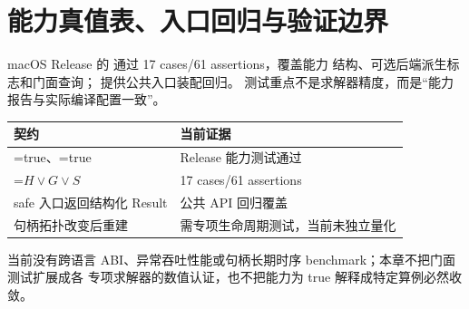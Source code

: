 \section{能力真值表、入口回归与验证边界}\label{sec:api-numerical}

macOS Release 的  通过 17 cases/61 assertions，覆盖能力
结构、可选后端派生标志和门面查询； 提供公共入口装配回归。
测试重点不是求解器精度，而是“能力报告与实际编译配置一致”。

\begin{center}\small
\begin{tabular}{@{}L{6.5cm}L{5.0cm}@{}}
\toprule 契约 & 当前证据\\\midrule
{}=true、=true & Release 能力测试通过\\
=$H\lor G\lor S$ & 17 cases/61 assertions\\
safe 入口返回结构化 Result & 公共 API 回归覆盖\\
句柄拓扑改变后重建 & 需专项生命周期测试，当前未独立量化\\
\bottomrule
\end{tabular}
\end{center}

当前没有跨语言 ABI、异常吞吐性能或句柄长期时序 benchmark；本章不把门面测试扩展成各
专项求解器的数值认证，也不把能力为 true 解释成特定算例必然收敛。
